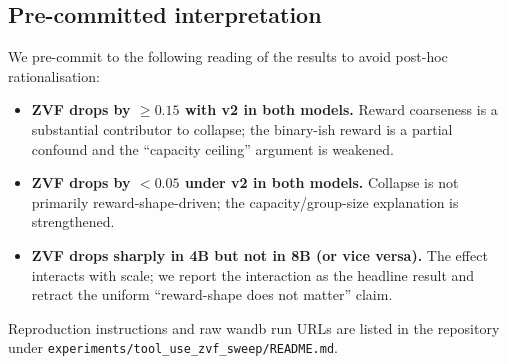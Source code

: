 \subsection{Pre-committed interpretation}
We pre-commit to the following reading of the results to avoid post-hoc
rationalisation:
\begin{itemize}
  \item \textbf{ZVF drops by \(\geq 0.15\) with v2 in both models.}
        Reward coarseness is a substantial contributor to collapse;
        the binary-ish reward is a partial confound and the
        ``capacity ceiling'' argument is weakened.
  \item \textbf{ZVF drops by \(<0.05\) under v2 in both models.}
        Collapse is not primarily reward-shape-driven; the
        capacity/group-size explanation is strengthened.
  \item \textbf{ZVF drops sharply in 4B but not in 8B (or vice versa).}
        The effect interacts with scale; we report the interaction as
        the headline result and retract the uniform ``reward-shape does
        not matter'' claim.
\end{itemize}

Reproduction instructions and raw wandb run URLs are listed in the
repository under \texttt{experiments/tool\_use\_zvf\_sweep/README.md}.
